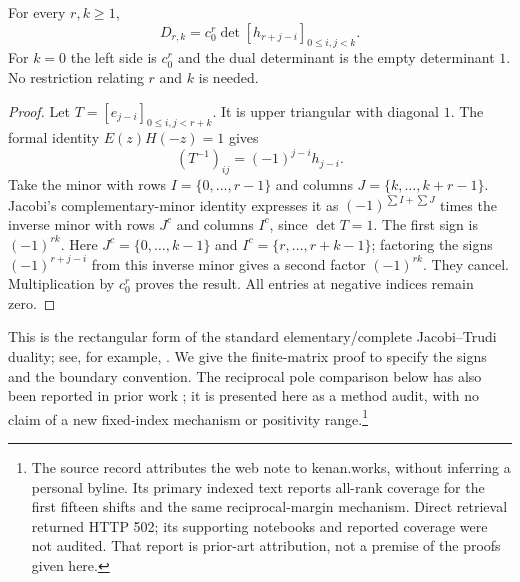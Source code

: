 \begin{proposition}
\label{rgd:duality}
For every $r,k\ge1$,
\begin{equation}
 D_{r,k}=c_0^r\det[h_{r+j-i}]_{0\le i,j<k}.
 \label{rgd:dual-equation}
\end{equation}
For $k=0$ the left side is $c_0^r$ and the dual determinant is the
empty determinant $1$.  No restriction relating $r$ and $k$ is needed.
\end{proposition}
\begin{proof}
Let $T=[e_{j-i}]_{0\le i,j<r+k}$.  It is upper triangular with diagonal
$1$.  The formal identity $E(z)H(-z)=1$ gives
\[
 (T^{-1})_{ij}=(-1)^{j-i}h_{j-i}.
\]
Take the minor with rows $I=\{0,\ldots,r-1\}$ and columns
$J=\{k,\ldots,k+r-1\}$.  Jacobi's complementary-minor identity expresses
it as $(-1)^{\sum I+\sum J}$ times the inverse minor with rows $J^c$ and
columns $I^c$, since $\det T=1$.  The first sign is $(-1)^{rk}$.
Here $J^c=\{0,\ldots,k-1\}$ and $I^c=\{r,\ldots,r+k-1\}$;
factoring the signs $(-1)^{r+j-i}$ from this inverse minor gives a
second factor $(-1)^{rk}$.  They cancel.  Multiplication by $c_0^r$
proves the result.  All entries at negative indices remain zero.
\end{proof}

This is the rectangular form of the standard elementary/complete
Jacobi--Trudi duality; see, for example,
\cite[\S2.1]{GarciaGarciaTierz2020Accepted}.  We give the finite-matrix
proof to specify the signs and the boundary convention.  The reciprocal
pole comparison below has also been reported in prior work
\cite{KenanFifteenShifts2026}; it is presented here as a method audit,
with no claim of a new fixed-index mechanism or positivity range.\footnote{
The source record attributes the web note to kenan.works, without inferring
a personal byline.  Its primary indexed text reports all-rank coverage
for the first fifteen shifts and the same reciprocal-margin mechanism.
Direct retrieval returned HTTP 502; its supporting notebooks and reported
coverage were not audited.  That report is prior-art attribution, not a
premise of the proofs given here.}

